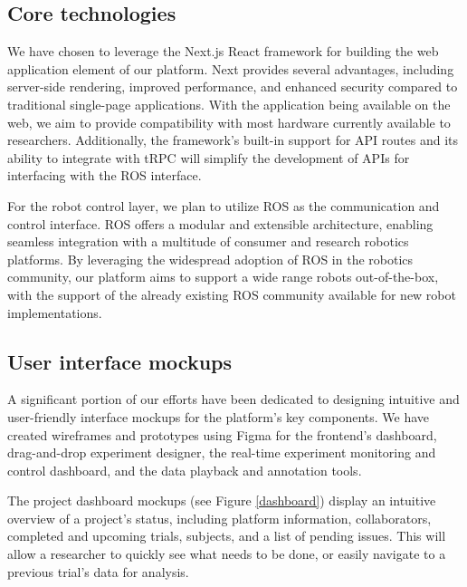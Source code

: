 \documentclass[letterpaper, 10 pt, conference]{ieeeconf}
\begin{document}
\subsection{Core technologies}

We have chosen to leverage the Next.js React framework for building the web application element of our platform. Next provides several advantages, including server-side rendering, improved performance, and enhanced security compared to traditional single-page applications. With the application being available on the web, we aim to provide compatibility with most hardware currently available to researchers. Additionally, the framework's built-in support for API routes and its ability to integrate with tRPC will simplify the development of APIs for interfacing with the ROS interface.

For the robot control layer, we plan to utilize ROS as the communication and control interface. ROS offers a modular and extensible architecture, enabling seamless integration with a multitude of consumer and research robotics platforms. By leveraging the widespread adoption of ROS in the robotics community, our platform aims to support a wide range robots out-of-the-box, with the support of the already existing ROS community available for new robot implementations.

\subsection{User interface mockups}

A significant portion of our efforts have been dedicated to designing intuitive and user-friendly interface mockups for the platform's key components. We have created wireframes and prototypes using Figma for the frontend's dashboard, drag-and-drop experiment designer, the real-time experiment monitoring and control dashboard, and the data playback and annotation tools.

The project dashboard mockups (see Figure \ref{dashboard}) display an intuitive overview of a project's status, including platform information, collaborators, completed and upcoming trials, subjects, and a list of pending issues. This will allow a researcher to quickly see what needs to be done, or easily navigate to a previous trial's data for analysis.
\end{document}
